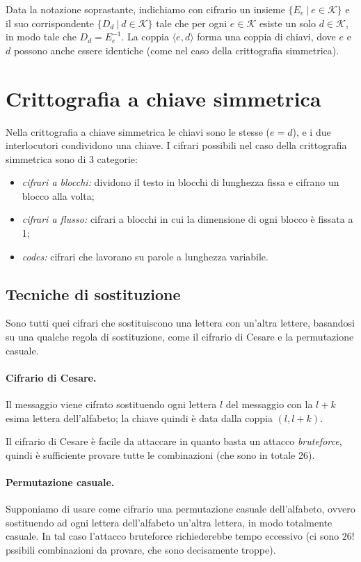 \documentclass[a4paper, 10pt, twoside]{article}
\newcommand{\encr}{E_e}
\newcommand{\decr}{D_d}
\begin{document}
	Data la notazione soprastante, indichiamo con cifrario un insieme $\lbrace \encr\ |\ e \in \mathcal{K} \rbrace$ e il suo corrispondente $\lbrace \decr\ |\ d \in \mathcal{K} \rbrace$ tale che per ogni $e \in \mathcal{K}$ esiste un solo $d \in \mathcal{K}$, in modo tale che $\decr = \encr^{-1}$. La coppia $\langle e, d \rangle$ forma una coppia di chiavi, dove $e$ e $d$ possono anche essere identiche (come nel caso della crittografia simmetrica).
	
	\section{Crittografia a chiave simmetrica}
	Nella crittografia a chiave simmetrica le chiavi sono le stesse ($e = d$), e i due interlocutori condividono una chiave. I cifrari possibili nel caso della crittografia simmetrica sono di 3 categorie: \begin{itemize}
		\item \textit{cifrari a blocchi:} dividono il testo in blocchi di lunghezza fissa e cifrano un blocco alla volta;
		\item \textit{cifrari a flusso:} cifrari a blocchi in cui la dimensione di ogni blocco è fissata a 1;
		\item \textit{codes:} cifrari che lavorano su parole a lunghezza variabile.
	\end{itemize}

	\subsection{Tecniche di sostituzione}
	Sono tutti quei cifrari che sostituiscono una lettera con un'altra lettere, basandosi su una qualche regola di sostituzione, come il cifrario di Cesare e la permutazione casuale.
	
	\paragraph{Cifrario di Cesare.}
	Il messaggio viene cifrato sostituendo ogni lettera $l$ del messaggio con la $l+k$ esima lettera dell'alfabeto; la chiave quindi è data dalla coppia $(l, l+k)$. 
	
	Il cifrario di Cesare è facile da attaccare in quanto basta un attacco \textit{bruteforce}, quindi è sufficiente provare tutte le combinazioni (che sono in totale 26).
	
	\paragraph{Permutazione casuale.}
	Supponiamo di usare come cifrario una permutazione casuale dell'alfabeto, ovvero sostituendo ad ogni lettera dell'alfabeto un'altra lettera, in modo totalmente casuale. In tal caso l'attacco bruteforce richiederebbe tempo eccessivo (ci sono $26!$ pssibili combinazioni da provare, che sono decisamente troppe). 
	
\end{document}
